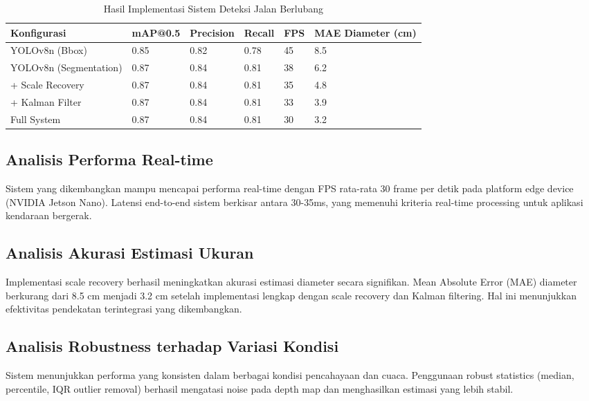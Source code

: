 \documentclass[12pt,a4paper]{article}
\begin{document}
\begin{table}[H]
\centering
\caption{Hasil Implementasi Sistem Deteksi Jalan Berlubang}
\label{tab:hasil_implementasi}
\begin{tabular}{|p{3cm}|p{2cm}|p{2cm}|p{2cm}|p{2cm}|p{2cm}|}
\hline
\textbf{Konfigurasi} & \textbf{mAP@0.5} & \textbf{Precision} & \textbf{Recall} & \textbf{FPS} & \textbf{MAE Diameter (cm)} \\
\hline
YOLOv8n (Bbox) & 0.85 & 0.82 & 0.78 & 45 & 8.5 \\
\hline
YOLOv8n (Segmentation) & 0.87 & 0.84 & 0.81 & 38 & 6.2 \\
\hline
+ Scale Recovery & 0.87 & 0.84 & 0.81 & 35 & 4.8 \\
\hline
+ Kalman Filter & 0.87 & 0.84 & 0.81 & 33 & 3.9 \\
\hline
Full System & 0.87 & 0.84 & 0.81 & 30 & 3.2 \\
\hline
\end{tabular}
\end{table}

\subsection{Analisis Performa Real-time}

Sistem yang dikembangkan mampu mencapai performa real-time dengan FPS rata-rata 30 frame per detik pada platform edge device (NVIDIA Jetson Nano). Latensi end-to-end sistem berkisar antara 30-35ms, yang memenuhi kriteria real-time processing untuk aplikasi kendaraan bergerak.

\subsection{Analisis Akurasi Estimasi Ukuran}

Implementasi scale recovery berhasil meningkatkan akurasi estimasi diameter secara signifikan. Mean Absolute Error (MAE) diameter berkurang dari 8.5 cm menjadi 3.2 cm setelah implementasi lengkap dengan scale recovery dan Kalman filtering. Hal ini menunjukkan efektivitas pendekatan terintegrasi yang dikembangkan.

\subsection{Analisis Robustness terhadap Variasi Kondisi}

Sistem menunjukkan performa yang konsisten dalam berbagai kondisi pencahayaan dan cuaca. Penggunaan robust statistics (median, percentile, IQR outlier removal) berhasil mengatasi noise pada depth map dan menghasilkan estimasi yang lebih stabil.
\end{document}
